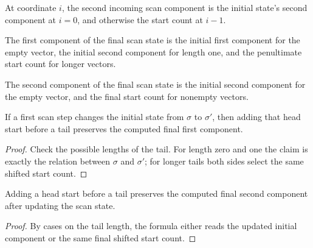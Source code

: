 \begin{definition}

  \label{def:scan_prev1}
  At coordinate \(i\), the second incoming scan component is the initial
  state's second component at \(i=0\), and otherwise the start count at
  \(i-1\).
\end{definition}

\begin{definition}

  \label{def:scan_out1}
  The first component of the final scan state is the initial first
  component for the empty vector, the initial second component for length
  one, and the penultimate start count for longer vectors.
\end{definition}

\begin{definition}

  \label{def:scan_out2}
  The second component of the final scan state is the initial second
  component for the empty vector, and the final start count for nonempty
  vectors.
\end{definition}

\begin{lemma}

  \label{lem:scan_out1_cons}
  If a first scan step changes the initial state from \(\sigma\) to
  \(\sigma'\), then adding that head start before a tail preserves the
  computed final first component.
\end{lemma}
\begin{proof}

\leanok
  Check the possible lengths of the tail.  For length zero and one the
  claim is exactly the relation between \(\sigma\) and \(\sigma'\); for
  longer tails both sides select the same shifted start count.
\end{proof}

\begin{lemma}

  \label{lem:scan_out2_cons}
  Adding a head start before a tail preserves the computed final second
  component after updating the scan state.
\end{lemma}
\begin{proof}

\leanok
  By cases on the tail length, the formula either reads the updated
  initial component or the same final shifted start count.
\end{proof}

